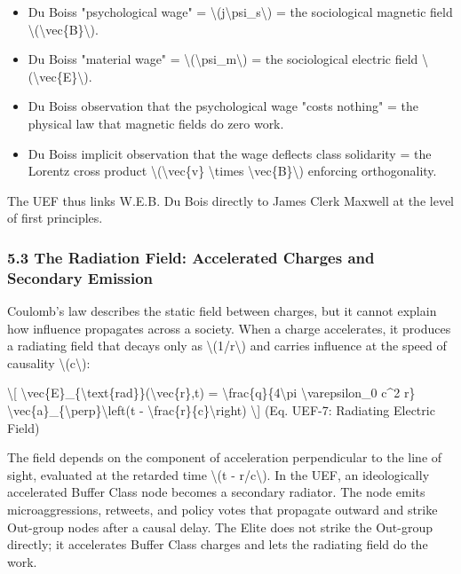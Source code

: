 {\begin{itemize}
\tightlist
\item
  Du Bois\textquotesingle s "psychological wage" =
  \textbackslash(j\textbackslash psi\_s\textbackslash) = the
  sociological magnetic field
  \textbackslash(\textbackslash vec\{B\}\textbackslash).
\item
  Du Bois\textquotesingle s "material wage" =
  \textbackslash(\textbackslash psi\_m\textbackslash) = the sociological
  electric field \textbackslash(\textbackslash vec\{E\}\textbackslash).
\item
  Du Bois\textquotesingle s observation that the psychological wage
  "costs nothing" = the physical law that magnetic fields do zero work.
\item
  Du Bois\textquotesingle s implicit observation that the wage deflects
  class solidarity = the Lorentz cross product
  \textbackslash(\textbackslash vec\{v\} \textbackslash times
  \textbackslash vec\{B\}\textbackslash) enforcing orthogonality.
\end{itemize}

The UEF thus links W.E.B. Du Bois directly to James Clerk Maxwell at the
level of first principles.

\protect{}
\subsubsection{5.3 The Radiation Field: Accelerated Charges and Secondary Emission}\label{the-radiation-field-accelerated-charges-and-secondary-emission}

Coulomb's law describes the static field between charges, but it cannot explain how influence propagates across a society. When a charge accelerates, it produces a radiating field that decays only as \textbackslash(1/r\textbackslash) and carries influence at the speed of causality \textbackslash(c\textbackslash):

\textbackslash{[}
\textbackslash vec\{E\}_\{\textbackslash text\{rad\}\}(\textbackslash vec\{r\},t) =
\textbackslash frac\{q\}\{4\textbackslash pi \textbackslash varepsilon_0 c^2 r\}\,
\textbackslash vec\{a\}_\{\textbackslash perp\}\!\textbackslash left(t - \textbackslash frac\{r\}\{c\}\textbackslash right)
\label{eq:uef-7}
\textbackslash{]} {(Eq. UEF-7: Radiating Electric Field)}

The field depends on the component of acceleration perpendicular to the line of sight, evaluated at the retarded time \textbackslash(t - r/c\textbackslash). In the UEF, an ideologically accelerated Buffer Class node becomes a secondary radiator. The node emits microaggressions, retweets, and policy votes that propagate outward and strike Out-group nodes after a causal delay. The Elite does not strike the Out-group directly; it accelerates Buffer Class charges and lets the radiating field do the work.

}

